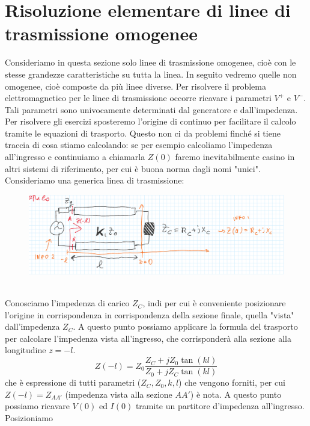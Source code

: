 \documentclass{book}
\begin{document}
    \section{Risoluzione elementare di linee di trasmissione omogenee}
        Consideriamo in questa sezione solo linee di trasmissione omogenee, cioè con le stesse grandezze 
        caratteristiche su tutta la linea. In seguito vedremo quelle non omogenee, cioè composte da più linee diverse.
        Per risolvere il problema elettromagnetico per le linee di trasmissione occorre ricavare i parametri
        $V^{+}$ e $V^{-}$. Tali parametri sono univocamente determinati dal generatore e dall'impedenza.
        Per risolvere gli esercizi sposteremo l'origine di continuo per facilitare il calcolo tramite le equazioni di trasporto.
        Questo non ci da problemi finché si tiene traccia di cosa stiamo calcolando: se per esempio calcoliamo l'impedenza all'ingresso e 
        continuiamo a chiamarla $Z(0)$ faremo inevitabilmente casino in altri sistemi di riferimento, per cui è buona norma dagli 
        nomi "unici". \\
        Consideriamo una generica linea di trasmissione:
        \begin{figure}[h!]
            \center 
            \includegraphics[width=0.75\linewidth]{Chapter_two/Chapt2img8.png}
        \end{figure}
        \\ Conosciamo l'impedenza di carico $Z_{C}$, indi per cui è conveniente posizionare l'origine in corrispondenza
        in corrispondenza della sezione finale, quella "vista" dall'impedenza $Z_{C}$. A questo punto possiamo
        applicare la formula del trasporto per calcolare l'impedenza vista all'ingresso, che corrisponderà alla sezione 
        alla longitudine $z=-l$.
        \begin{equation}
            Z(-l)  = Z_{0} \frac{Z_{C}+jZ_{0}\tan(k l)}{Z_{0}+j Z_{C}\tan(kl)}
        \end{equation}
        che è espressione di tutti parametri ($Z_{C}, Z_{0}, k, l$) che vengono forniti, per cui
        $Z(-l) = Z_{AA'}$ (impedenza vista alla sezione $AA'$) è nota.
        A questo punto possiamo ricavare $V(0)$ ed $I(0)$ tramite un partitore d'impedenza all'ingresso. Posizioniamo
\end{document}
